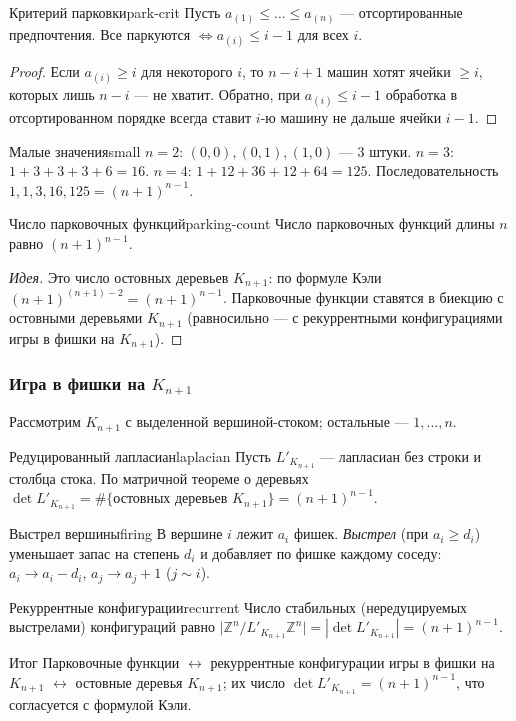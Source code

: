 \begin{Statement}{Критерий парковки}{park-crit}
	Пусть $a_{(1)}\le\dots\le a_{(n)}$ — отсортированные предпочтения. Все паркуются $\iff a_{(i)}\le i-1$ для всех $i$.
\end{Statement}

\begin{proof}
	Если $a_{(i)}\ge i$ для некоторого $i$, то $n-i+1$ машин хотят ячейки $\ge i$, которых лишь $n-i$ — не хватит. Обратно, при $a_{(i)}\le i-1$ обработка в отсортированном порядке всегда ставит $i$-ю машину не дальше ячейки $i-1$.
\end{proof}

\begin{Example}{Малые значения}{small}
	$n=2$: $(0,0),(0,1),(1,0)$ — $3$ штуки. $n=3$: $1+3+3+3+6=16$. $n=4$: $1+12+36+12+64=125$. Последовательность $1,1,3,16,125=(n+1)^{n-1}$.
\end{Example}

\begin{Theorem}{Число парковочных функций}{parking-count}
	Число парковочных функций длины $n$ равно $(n+1)^{n-1}$.
\end{Theorem}

\begin{proof}[Идея]
	Это число остовных деревьев $K_{n+1}$: по формуле Кэли $(n+1)^{(n+1)-2}=(n+1)^{n-1}$. Парковочные функции ставятся в биекцию с остовными деревьями $K_{n+1}$ (равносильно — с рекуррентными конфигурациями игры в фишки на $K_{n+1}$).
\end{proof}

\subsubsection*{Игра в фишки на $K_{n+1}$}

Рассмотрим $K_{n+1}$ с выделенной вершиной-стоком; остальные — $1,\dots,n$.

\begin{Remark}{Редуцированный лапласиан}{laplacian}
	Пусть $L'_{K_{n+1}}$ — лапласиан без строки и столбца стока. По матричной теореме о деревьях $\det L'_{K_{n+1}}=\#\{\text{остовных деревьев }K_{n+1}\}=(n+1)^{n-1}$.
\end{Remark}

\begin{Definition}{Выстрел вершины}{firing}
	В вершине $i$ лежит $a_i$ фишек. \emph{Выстрел} (при $a_i\ge d_i$) уменьшает запас на степень $d_i$ и добавляет по фишке каждому соседу: $a_i\to a_i-d_i$, $a_j\to a_j+1$ ($j\sim i$).
\end{Definition}

\begin{Statement}{Рекуррентные конфигурации}{recurrent}
	Число стабильных (нередуцируемых выстрелами) конфигураций равно $\bigl|\mathbb Z^n/L'_{K_{n+1}}\mathbb Z^n\bigr|=|\det L'_{K_{n+1}}|=(n+1)^{n-1}$.
\end{Statement}

\begin{Remark}{Итог}{}
	Парковочные функции $\leftrightarrow$ рекуррентные конфигурации игры в фишки на $K_{n+1}$ $\leftrightarrow$ остовные деревья $K_{n+1}$; их число $\det L'_{K_{n+1}}=(n+1)^{n-1}$, что согласуется с формулой Кэли.
\end{Remark}
